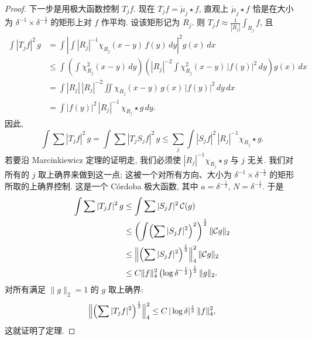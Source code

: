 \begin{proof}
下一步是用极大函数控制 $T_jf$. 现在 $T_jf=\check{\mu}_j\star f$, 直观上 $\check{\mu}_j\star f$ 恰是在大小为 $\delta^{-1}\times\delta^{-\frac{1}{2}}$ 的矩形上对 $f$ 作平均. 设该矩形记为 $R_j$. 则 $T_jf\approx\frac{1}{|R_j|}\int_{R_j}f$, 且
\begin{align*}
\int|T_{j}f|^{2}\,g
&=\int\left|\int|R_{j}|^{-1}\chi_{R_{j}}(x-y)\,f(y)\,dy\right|^{2}g(x)\,dx \\
&\leq\int\left(\int\chi_{R_{j}}^{2}(x-y)\,dy\right)
\left(|R_{j}|^{-2}\int\chi_{R_{j}}^{2}(x-y)\,|f(y)|^{2}\,dy\right)g(x)\,dx \\
&=\int|R_{j}|\,|R_{j}|^{-2}\iint\chi_{R_{j}}(x-y)\,g(x)\,|f(y)|^{2}\,dy\,dx \\
&=\int|f(y)|^{2}\,|R_{j}|^{-1}\,\chi_{R_{j}}\star g\,dy.
\end{align*}
因此,
\[
\int\sum|T_{j}f|^{2}\,g=\int\sum|T_{j}S_{j}f|^{2}\,g
\leq\sum_j\int|S_{j}f|^{2}\,|R_{j}|^{-1}\chi_{R_{j}}\star g.
\]
若要沿 Marcinkiewicz 定理的证明走, 我们必须使 $|R_j|^{-1}\chi_{R_j}\star g$ 与 $j$ 无关. 我们对所有的 $j$ 取上确界来做到这一点; 这被一个对所有方向、大小为 $\delta^{-1}\times\delta^{-\frac{1}{2}}$ 的矩形所取的上确界控制. 这是一个 C\'ordoba 极大函数, 其中 $a=\delta^{-\frac{1}{2}}$, $N=\delta^{-\frac{1}{2}}$. 于是
\begin{align*}
\int\sum|T_{j}f|^{2}\,g
&\leq\int\sum|S_{j}f|^{2}\,\mathcal{C}(g) \\
&\leq\left(\int\Bigl(\sum|S_{j}f|^{2}\Bigr)^{2}\right)^{\frac{1}{2}}\|\mathcal{C}g\|_{2} \\
&\leq\Bigl\|\Bigl(\sum|S_{j}f|^{2}\Bigr)^{\frac{1}{2}}\Bigr\|_{4}^{2}\,\|\mathcal{C}g\|_{2} \\
&\leq C\|f\|_{4}^{2}\,\bigl(\log\delta^{-\frac{1}{2}}\bigr)^{\frac{1}{2}}\,\|g\|_{2}.
\end{align*}
对所有满足 $\|g\|_2=1$ 的 $g$ 取上确界:
\[
\Bigl\|\Bigl(\sum|T_{j}f|^{2}\Bigr)^{\frac{1}{2}}\Bigr\|_{4}^{2}
\leq C\,|\log\delta|^{\frac{1}{2}}\,\|f\|_{4}^{2},
\]
这就证明了定理.


\end{proof}
